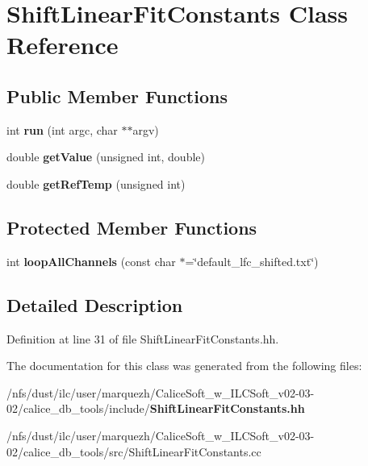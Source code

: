 \section{Shift\-Linear\-Fit\-Constants Class Reference}
\label{classShiftLinearFitConstants}
\subsection*{Public Member Functions}
\begin{DoxyCompactItemize}
\item 
int {\bfseries run} (int argc, char $\ast$$\ast$argv)\label{classShiftLinearFitConstants_a87df3cbfbd584a8506662b2c5ae5ab2b}

\item 
double {\bfseries get\-Value} (unsigned int, double)\label{classShiftLinearFitConstants_ad6c9887ba7691ffd393d3a30bd28c4b8}

\item 
double {\bfseries get\-Ref\-Temp} (unsigned int)\label{classShiftLinearFitConstants_a357bca386c28b29a5d897dd5389b9c94}

\end{DoxyCompactItemize}
\subsection*{Protected Member Functions}
\begin{DoxyCompactItemize}
\item 
int {\bfseries loop\-All\-Channels} (const char $\ast$=\char`\"{}default\-\_\-lfc\-\_\-shifted.\-txt\char`\"{})\label{classShiftLinearFitConstants_a4c83bab781c2054dde88cb69dc03f01c}

\end{DoxyCompactItemize}


\subsection{Detailed Description}


Definition at line 31 of file Shift\-Linear\-Fit\-Constants.\-hh.



The documentation for this class was generated from the following files\-:\begin{DoxyCompactItemize}
\item 
/nfs/dust/ilc/user/marquezh/\-Calice\-Soft\-\_\-w\-\_\-\-I\-L\-C\-Soft\-\_\-v02-\/03-\/02/calice\-\_\-db\-\_\-tools/include/{\bf Shift\-Linear\-Fit\-Constants.\-hh}\item 
/nfs/dust/ilc/user/marquezh/\-Calice\-Soft\-\_\-w\-\_\-\-I\-L\-C\-Soft\-\_\-v02-\/03-\/02/calice\-\_\-db\-\_\-tools/src/Shift\-Linear\-Fit\-Constants.\-cc\end{DoxyCompactItemize}
